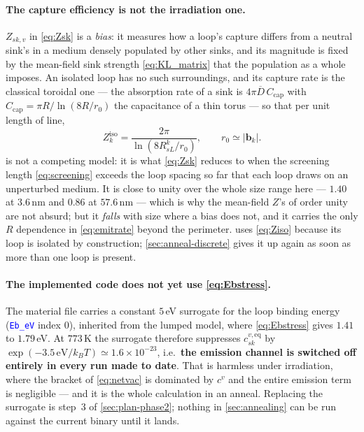\documentclass{article}
\newcommand{\textttclr}[1]{\textcolor{blue}{\texttt{#1}}}
\newcommand{\bvec}{\bm b}
\begin{document}
\paragraph{The capture efficiency is not the irradiation one.} $Z_{sk,v}$ in
\cref{eq:Zsk} is a \emph{bias}: it measures how a loop's capture differs from a
neutral sink's in a medium densely populated by other sinks, and its magnitude is
fixed by the mean-field sink strength \cref{eq:KL_matrix} that the population as
a whole imposes. An isolated loop has no such surroundings, and its capture rate
is the classical toroidal one --- the absorption rate of a sink is $4\pi
\overline D\,C_{\mathrm{cap}}$ with $C_{\mathrm{cap}}=\pi R/\ln(8R/r_0)$ the
capacitance of a thin torus --- so that per unit length of line,
\begin{equation}
  Z^{\mathrm{iso}}_k=\frac{2\pi}{\ln\!\left(8R^k_{sL}/r_0\right)},
  \qquad r_0\simeq|\bvec_k| .
  \label{eq:Ziso}
\end{equation}
 is not a competing model: it is what \cref{eq:Zsk} reduces to when
the screening length \cref{eq:screening} exceeds the loop spacing so far that
each loop draws on an unperturbed medium. It is close to unity over the whole
size range here --- $1.40$ at $3.6\,$nm and $0.86$ at $57.6\,$nm --- which is why
the mean-field $Z$'s of order unity are not absurd; but it \emph{falls} with
size where a bias does not, and it carries the only $R$ dependence in
\cref{eq:emitrate} beyond the perimeter.  uses
\cref{eq:Ziso} because its loop is isolated by construction;
\cref{sec:anneal-discrete} gives it up again as soon as more than one loop is
present.

\paragraph{The implemented code does not yet use \cref{eq:Ebstress}.} The
material file carries a constant $5\,$eV surrogate for the loop binding energy
(\textttclr{Eb\_eV} index $0$), inherited from the lumped model, where
\cref{eq:Ebstress} gives $1.41$ to $1.79\,$eV. At $773\,$K the surrogate
therefore suppresses $c^{v,\mathrm{eq}}_{sk}$ by
$\exp(-3.5\,\mathrm{eV}/k_BT)\simeq1.6\times10^{-23}$, i.e.\ \textbf{the emission
channel is switched off entirely in every run made to date}. That is harmless under irradiation, where
the bracket of \cref{eq:netvac} is dominated by $c^v$ and the entire emission
term is negligible --- and it is the whole calculation in an anneal. Replacing
the surrogate is step~3 of \cref{sec:plan-phase2}; nothing in
\cref{sec:annealing} can be run against the current binary until it lands.
\end{document}

